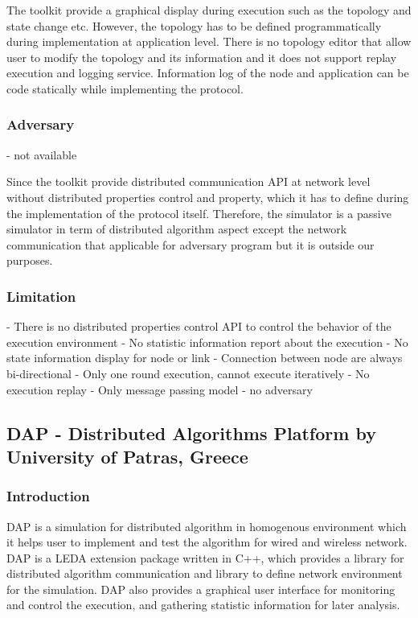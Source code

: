 The toolkit provide a graphical display during execution such as the topology and state change etc. However, the topology has to be defined programmatically during implementation at application level. There is no topology editor that allow user to modify the topology and its information and it does not support replay execution and logging service. Information log of the node and application can be code statically while implementing the protocol.

\subsubsection{Adversary}
- not available

Since the toolkit provide distributed communication API at network level without distributed properties control and property, which it has to define during the implementation of  the protocol itself. Therefore, the simulator is a passive simulator in term of distributed algorithm aspect except the network communication that applicable for adversary program but it is outside our purposes.

\subsubsection{Limitation}
- There is no distributed properties control API to control the behavior of the execution environment
- No statistic information report about the execution
- No state information display for node or link
- Connection between node are always bi-directional
- Only one round execution, cannot execute iteratively
- No execution replay
- Only message passing model
- no adversary










\subsection{DAP - Distributed Algorithms Platform by University of Patras, Greece}

\subsubsection{Introduction}
DAP is a simulation for distributed algorithm in homogenous environment which it helps user to implement and test the algorithm for wired and wireless network. DAP is a LEDA extension package written in C++, which provides a library for distributed algorithm communication and library to define network environment for the simulation. DAP also provides a graphical user interface for monitoring and control the execution, and gathering statistic information for later analysis.

